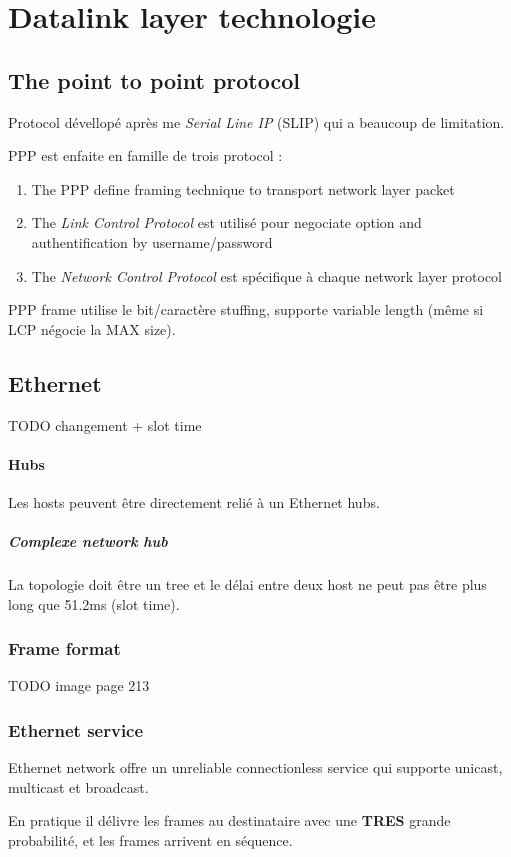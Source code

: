 \documentclass{report}
\begin{document}
\section{Datalink layer technologie}

\subsection{The point to point protocol}
Protocol dévellopé après me \textit{Serial Line IP} (SLIP) qui a beaucoup de limitation.

PPP est enfaite en famille de trois protocol :
\begin{enumerate}
    \item The PPP define framing technique to transport network layer packet
    \item The \textit{Link Control Protocol} est utilisé pour negociate option and authentification by username/password
    \item The \textit{Network Control Protocol} est spécifique à chaque network layer protocol
\end{enumerate}

PPP frame utilise le bit/caractère stuffing, supporte variable length (même si LCP négocie la MAX size).

\subsection{Ethernet}
TODO changement + slot time

\paragraph{Hubs}
Les hosts peuvent être directement relié à un Ethernet hubs. 
\subparagraph{Complexe network hub} La topologie doit être un tree et le délai entre
deux host ne peut pas être plus long que 51.2ms (slot time).

\subsubsection{Frame format}
TODO image page 213

\subsubsection{Ethernet service}
Ethernet network offre un unreliable connectionless service qui supporte unicast, multicast et
broadcast.

En pratique il délivre les frames au destinataire avec une \textbf{TRES} grande probabilité,
et les frames arrivent en séquence.
\end{document}
